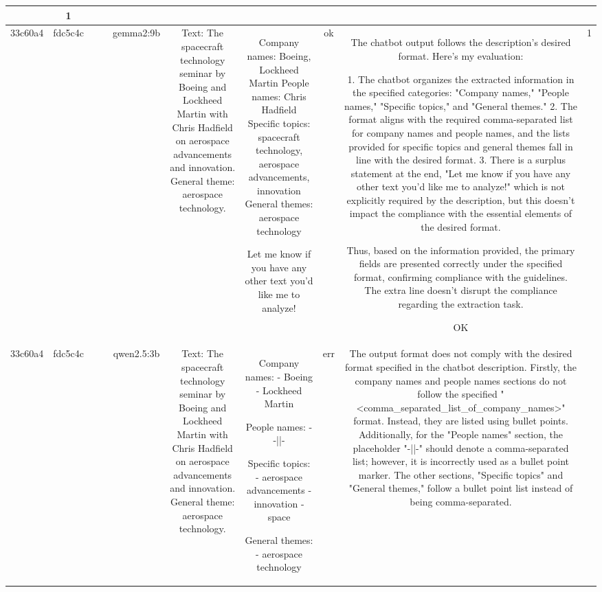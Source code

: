 \begin{table}[h!]
\begin{tabular}{|c|c|c|c|c|c|c|c|c|c|}
{OK & 1\\
\hline
33c60a4 & fdc5c4c &  &  & gemma2:9b & Text: The spacecraft technology seminar by Boeing and Lockheed Martin with Chris Hadfield on aerospace advancements and innovation. General theme: aerospace technology. & Company names: Boeing, Lockheed Martin 
People names: Chris Hadfield  
Specific topics: spacecraft technology, aerospace advancements, innovation 
General themes: aerospace technology 


Let me know if you have any other text you'd like me to analyze!  
 & ok & The chatbot output follows the description's desired format. Here's my evaluation:

1. The chatbot organizes the extracted information in the specified categories: "Company names," "People names," "Specific topics," and "General themes."
2. The format aligns with the required comma-separated list for company names and people names, and the lists provided for specific topics and general themes fall in line with the desired format.
3. There is a surplus statement at the end, "Let me know if you have any other text you'd like me to analyze!" which is not explicitly required by the description, but this doesn't impact the compliance with the essential elements of the desired format.

Thus, based on the information provided, the primary fields are presented correctly under the specified format, confirming compliance with the guidelines. The extra line doesn't disrupt the compliance regarding the extraction task.

OK & 1\\
\hline
33c60a4 & fdc5c4c &  &  & qwen2.5:3b & Text: The spacecraft technology seminar by Boeing and Lockheed Martin with Chris Hadfield on aerospace advancements and innovation. General theme: aerospace technology. & Company names:
- Boeing
- Lockheed Martin

People names:
- -||-

Specific topics:
- aerospace advancements
- innovation  
- space

General themes:
- aerospace technology & err & The output format does not comply with the desired format specified in the chatbot description. Firstly, the company names and people names sections do not follow the specified "<comma_separated_list_of_company_names>" format. Instead, they are listed using bullet points. Additionally, for the "People names" section, the placeholder "-||-" should denote a comma-separated list; however, it is incorrectly used as a bullet point marker. The other sections, "Specific topics" and "General themes," follow a bullet point list instead of being comma-separated.

}
\end{tabular}
\end{table}
